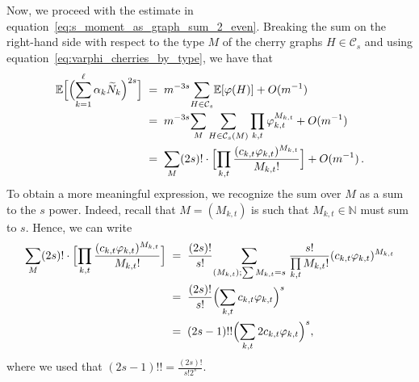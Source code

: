 \documentclass[reqno,a4paper,11pt]{amsart}
\theoremstyle{remark}
\newcommand{\mc}[1]{{\mathcal #1}}
\newcommand{\bb}[1]{{\mathbb #1}}
\numberwithin{equation}{section}
\begin{document}
Now, we proceed with the estimate in
equation~\eqref{eq:s_moment_as_graph_sum_2_even}. Breaking the sum on the
right-hand side with respect to the type $M$ of the cherry graphs $H \in \mc
C_s$ and using equation~\eqref{eq:varphi_cherries_by_type}, we have that
%
\begin{align}
\bb E\Bigl[ \Bigl(\sum_{k=1}^{\ell}\alpha_k \widetilde{N}_k\Bigr)^{2s}\Bigr]
    &\;=\; m^{-3s} \smash{\sum\limits_{H \in \mc C_s}} \bb E[\varphi(H)]
        + O(m^{-1})\nonumber\\
    &\;=\; m^{-3s} \smash{\sum_M\sum\limits_{H \in \mc C_s(M)}}
        \prod_{k,t} \varphi_{k,t}^{M_{k,t}} + O(m^{-1})\nonumber\\
\label{eq:2s_moment_by_M}
    &\;=\; \smash{\sum_M} (2s)! \cdot
    \Bigl[ \prod_{k,t} \frac{(c_{k,t}\varphi_{k,t})^{M_{k,t}}}{M_{k,t}!}\Bigr]
    + O(m^{-1})\,.
\end{align}
%
To obtain a more meaningful expression, we recognize the sum over $M$ as a sum to the $s$ power. Indeed, recall that $M = (M_{k,t})$
is such that $M_{k,t} \in \bb N$ must sum to $s$. Hence, we can write
%
\begin{align}
\smash{\sum_M} (2s)! \cdot
    \Bigl[ \prod_{k,t} \frac{(c_{k,t}\varphi_{k,t})^{M_{k,t}}}{M_{k,t}!}\Bigr]
    &\;=\; \frac{(2s)!}{s!}\smash{\sum_{(M_{k,t}); \sum M_{k,t}=s}}\;
        \frac{s!}{\prod\limits_{k,t} M_{k,t}!} 
        (c_{k,t}\varphi_{k,t})^{M_{k,t}}\nonumber\\
    &\;=\; \frac{(2s)!}{s!} \Bigl(\sum_{k,t} c_{k,t} \varphi_{k,t}\Bigr)^s\nonumber\\
\label{eq:2s_moment_by_M_2}
    &\;=\; (2s-1)!! \Bigl(\sum_{k,t} 2c_{k,t} \varphi_{k,t}\Bigr)^s,
\end{align}
%
where we used that $(2s-1)!! = \frac{(2s)!}{s!2^s}$.
\end{document}
